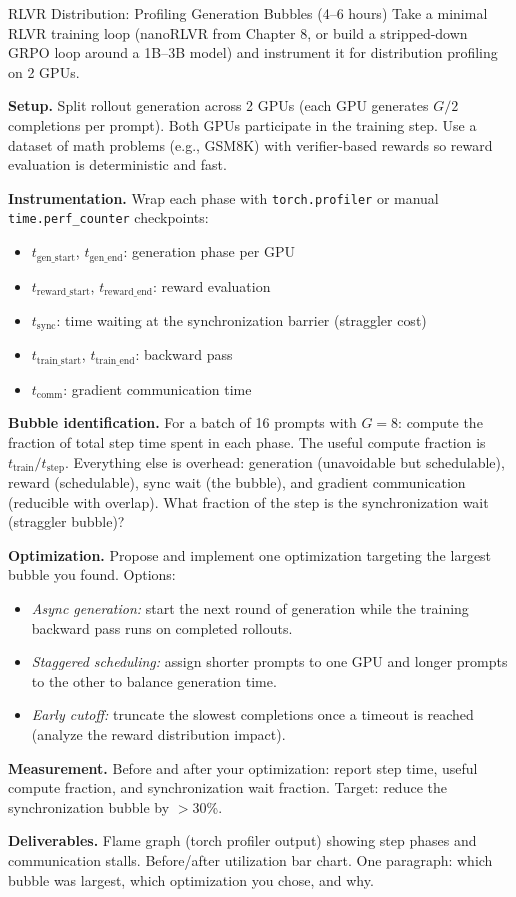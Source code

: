 \begin{exercise}{RLVR Distribution: Profiling Generation Bubbles (4--6 hours)}
Take a minimal RLVR training loop (nanoRLVR from Chapter 8, or build a stripped-down GRPO loop
around a 1B--3B model) and instrument it for distribution profiling on 2 GPUs.

\medskip
\textbf{Setup.}
Split rollout generation across 2 GPUs (each GPU generates $G/2$ completions per prompt).
Both GPUs participate in the training step.
Use a dataset of math problems (e.g., GSM8K) with verifier-based rewards so reward evaluation is
deterministic and fast.

\medskip
\textbf{Instrumentation.}
Wrap each phase with \texttt{torch.profiler} or manual \texttt{time.perf\_counter} checkpoints:
\begin{itemize}
  \item $t_{\text{gen\_start}}$, $t_{\text{gen\_end}}$: generation phase per GPU
  \item $t_{\text{reward\_start}}$, $t_{\text{reward\_end}}$: reward evaluation
  \item $t_{\text{sync}}$: time waiting at the synchronization barrier (straggler cost)
  \item $t_{\text{train\_start}}$, $t_{\text{train\_end}}$: backward pass
  \item $t_{\text{comm}}$: gradient communication time
\end{itemize}

\medskip
\textbf{Bubble identification.}
For a batch of 16 prompts with $G=8$:
compute the fraction of total step time spent in each phase.
The useful compute fraction is $t_{\text{train}} / t_{\text{step}}$.
Everything else is overhead: generation (unavoidable but schedulable), reward (schedulable),
sync wait (the bubble), and gradient communication (reducible with overlap).
What fraction of the step is the synchronization wait (straggler bubble)?

\medskip
\textbf{Optimization.}
Propose and implement one optimization targeting the largest bubble you found.
Options:
\begin{itemize}
  \item \emph{Async generation:} start the next round of generation while the training backward pass
        runs on completed rollouts.
  \item \emph{Staggered scheduling:} assign shorter prompts to one GPU and longer prompts to the
        other to balance generation time.
  \item \emph{Early cutoff:} truncate the slowest completions once a timeout is reached
        (analyze the reward distribution impact).
\end{itemize}

\medskip
\textbf{Measurement.}
Before and after your optimization: report step time, useful compute fraction,
and synchronization wait fraction.
Target: reduce the synchronization bubble by $>$30\%.

\medskip
\textbf{Deliverables.}
Flame graph (torch profiler output) showing step phases and communication stalls.
Before/after utilization bar chart.
One paragraph: which bubble was largest, which optimization you chose, and why.
\end{exercise}


